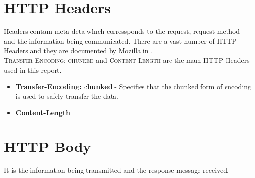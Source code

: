 \section{HTTP Headers}
Headers contain meta-deta which corressponds to the request, request method and the information being communicated. There are a vast number of HTTP Headers and they are documented by Mozilla in \cite{b17}.\\
\textsc{Transfer-Encoding: chunked} and \textsc{Content-Length} are the main HTTP Headers used in this report. \\
\begin{itemize}
	\item \textbf{Transfer-Encoding: chunked} - Specifies that the chunked form of encoding is used to safely transfer the data.
	\item \textbf{Content-Length}
\end{itemize}
\section{HTTP Body}
It is the information being transmitted and the response message received.